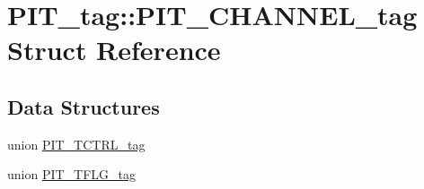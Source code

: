 \hypertarget{structPIT__tag_1_1PIT__CHANNEL__tag}{}\section{P\+I\+T\+\_\+tag\+::P\+I\+T\+\_\+\+C\+H\+A\+N\+N\+E\+L\+\_\+tag Struct Reference}
\label{structPIT__tag_1_1PIT__CHANNEL__tag}
\subsection*{Data Structures}
\begin{DoxyCompactItemize}
\item 
union \mbox{\hyperlink{unionPIT__tag_1_1PIT__CHANNEL__tag_1_1PIT__TCTRL__tag}{P\+I\+T\+\_\+\+T\+C\+T\+R\+L\+\_\+tag}}
\item 
union \mbox{\hyperlink{unionPIT__tag_1_1PIT__CHANNEL__tag_1_1PIT__TFLG__tag}{P\+I\+T\+\_\+\+T\+F\+L\+G\+\_\+tag}}
\end{DoxyCompactItemize}
